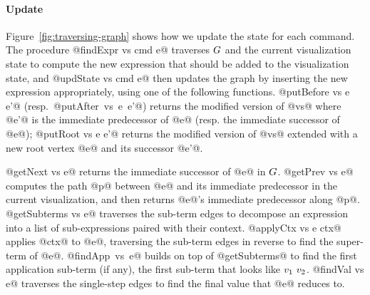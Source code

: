\paragraph{Update}
Figure~\ref{fig:traversing-graph} shows how we update the state
for each command.
%
The procedure @findExpr vs cmd e@ traverses $G$
and the current visualization state to compute the new
expression that should be added to the visualization state,
and @updState vs cmd e@ then updates the graph
by inserting the new expression appropriately, using one of
the following functions.
%
@putBefore vs e e'@ \hbox{(resp. @putAfter vs e e'@)}
returns the modified version of @vs@ where @e'@ is the
immediate predecessor of @e@ (resp. the immediate successor of @e@);
%
@putRoot vs e e'@ returns the modified version of @vs@ extended
with a new root vertex @e@ and its successor @e'@.
%

@getNext vs e@ returns the immediate successor of @e@ in $G$.
%
@getPrev vs e@ computes the path @p@ between @e@ and its immediate
predecessor in the current visualization, and then returns @e@'s immediate
predecessor along @p@.
%
@getSubterms vs e@ traverses the sub-term edges to decompose an
expression into a list of sub-expressions paired with their context.
%
@applyCtx vs e ctx@ applies @ctx@ to @e@, traversing the sub-term edges
in reverse to find the super-term of @e@.
%
\hbox{@findApp vs e@} builds on top of @getSubterms@ to find the first
application sub-term (if any), \ie the first sub-term that looks like
$v_1 \ v_2$.
%
@findVal vs e@ traverses the single-step edges to find the final value
that @e@ reduces to.
%

